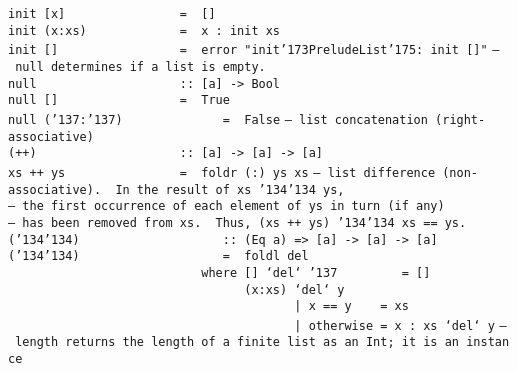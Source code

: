\mbox{\tt init\ [x]\ \ \ \ \ \ \ \ \ \ \ \ \ \ \ \ =\ \ []}\\
\mbox{\tt init\ (x:xs)\ \ \ \ \ \ \ \ \ \ \ \ \ =\ \ x\ :\ init\ xs}\\
\mbox{\tt init\ []\ \ \ \ \ \ \ \ \ \ \ \ \ \ \ \ \ =\ \ error\ "init{\char'173}PreludeList{\char'175}:\ init\ []"}
%
\eprogB\noindent\bprogB
\mbox{\tt --\ null\ determines\ if\ a\ list\ is\ empty.}\\
\mbox{\tt null\ \ \ \ \ \ \ \ \ \ \ \ \ \ \ \ \ \ \ \ ::\ [a]\ ->\ Bool}\\
\mbox{\tt null\ []\ \ \ \ \ \ \ \ \ \ \ \ \ \ \ \ \ =\ \ True}\\
\mbox{\tt null\ ({\char'137}:{\char'137})\ \ \ \ \ \ \ \ \ \ \ \ \ \ =\ \ False}
%
\eprogB\noindent\bprogB
\mbox{\tt --\ list\ concatenation\ (right-associative)}\\
\mbox{\tt (++)\ \ \ \ \ \ \ \ \ \ \ \ \ \ \ \ \ \ \ \ ::\ [a]\ ->\ [a]\ ->\ [a]}\\
\mbox{\tt xs\ ++\ ys\ \ \ \ \ \ \ \ \ \ \ \ \ \ \ \ =\ \ foldr\ (:)\ ys\ xs}
%
\eprogB\noindent\bprogB
\mbox{\tt --\ list\ difference\ (non-associative).\ \ In\ the\ result\ of\ xs\ {\char'134}{\char'134}\ ys,}\\
\mbox{\tt --\ the\ first\ occurrence\ of\ each\ element\ of\ ys\ in\ turn\ (if\ any)}\\
\mbox{\tt --\ has\ been\ removed\ from\ xs.\ \ Thus,\ (xs\ ++\ ys)\ {\char'134}{\char'134}\ xs\ ==\ ys.}\\
\mbox{\tt ({\char'134}{\char'134})\ \ \ \ \ \ \ \ \ \ \ \ \ \ \ \ \ \ \ \ ::\ (Eq\ a)\ =>\ [a]\ ->\ [a]\ ->\ [a]}\\
\mbox{\tt ({\char'134}{\char'134})\ \ \ \ \ \ \ \ \ \ \ \ \ \ \ \ \ \ \ \ =\ \ foldl\ del}\\
\mbox{\tt \ \ \ \ \ \ \ \ \ \ \ \ \ \ \ \ \ \ \ \ \ \ \ \ \ \ \ where\ []\ `del`\ {\char'137}\ \ \ \ \ \ \ \ \ =\ []}\\
\mbox{\tt \ \ \ \ \ \ \ \ \ \ \ \ \ \ \ \ \ \ \ \ \ \ \ \ \ \ \ \ \ \ \ \ \ (x:xs)\ `del`\ y}\\
\mbox{\tt \ \ \ \ \ \ \ \ \ \ \ \ \ \ \ \ \ \ \ \ \ \ \ \ \ \ \ \ \ \ \ \ \ \ \ \ \ \ \ \ |\ x\ ==\ y\ \ \ \ =\ xs}\\
\mbox{\tt \ \ \ \ \ \ \ \ \ \ \ \ \ \ \ \ \ \ \ \ \ \ \ \ \ \ \ \ \ \ \ \ \ \ \ \ \ \ \ \ |\ otherwise\ =\ x\ :\ xs\ `del`\ y}
%
\eprogB\noindent\bprogB
\mbox{\tt --\ length\ returns\ the\ length\ of\ a\ finite\ list\ as\ an\ Int;\ it\ is\ an\ instance}\\
